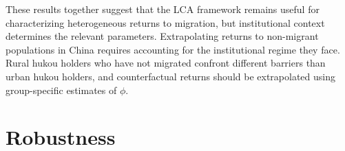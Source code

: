 \documentclass[12pt]{article}
\begin{document}

These results together suggest that the LCA framework remains useful for characterizing heterogeneous returns to migration, but institutional context determines the relevant parameters.
Extrapolating returns to non-migrant populations in China requires accounting for the institutional regime they face.
Rural hukou holders who have not migrated confront different barriers than urban hukou holders, and counterfactual returns should be extrapolated using group-specific estimates of $\phi$.








\section{Robustness}\label{sec:robustness}


\end{document}
